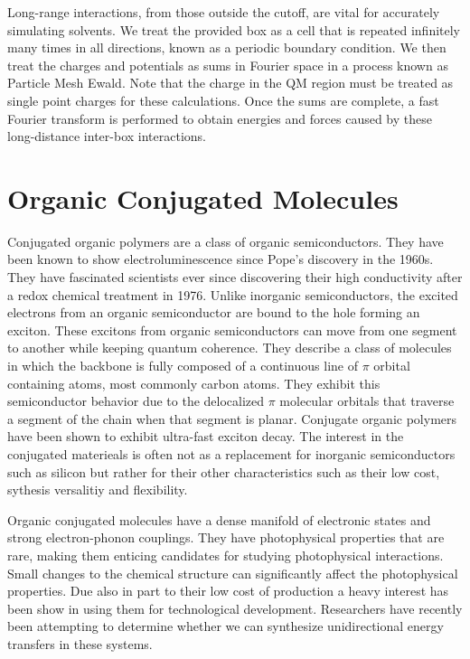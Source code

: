 Long-range interactions, from those outside the cutoff, are vital for accurately simulating solvents. 
We treat the provided box as a cell that is repeated infinitely many times in all directions, known as a periodic boundary condition. We then treat the charges and potentials as sums in Fourier space in a process known as Particle Mesh Ewald.\cite{Darden1993} Note that the charge in the QM region must be treated as single point charges for these calculations. Once the sums are complete, a fast Fourier transform is performed to obtain energies and forces caused by these long-distance inter-box interactions. \cite{Walker2008}

\section{Organic Conjugated Molecules}
Conjugated organic polymers are a class of organic semiconductors. They have been known to show electroluminescence since Pope's discovery in the 1960s.\cite{pope1963electroluminescence} They have fascinated scientists ever since discovering their high conductivity after a redox chemical treatment in 1976. \cite{chiang1977electrical} Unlike inorganic semiconductors, the excited electrons from an organic semiconductor are bound to the hole forming an exciton.\cite{scholes2011excitons} These excitons from organic semiconductors can move from one segment to another while keeping quantum coherence. \cite{collini2009coherent} They describe a class of molecules in which the backbone is fully composed of a continuous line of \(\pi\) orbital containing atoms, most commonly carbon atoms. They exhibit this semiconductor behavior due to the delocalized \(\pi\) molecular orbitals that traverse a segment of the chain when that segment is planar.\cite{bredas1999excited}
Conjugate organic polymers have been shown to exhibit ultra-fast exciton decay.\cite{nelson2018coherent,Fernandez-Alberti2009} The interest in the conjugated materieals is often not as a replacement for inorganic semiconductors such as silicon but rather for their other characteristics such as their low cost, sythesis versalitiy and flexibility. \cite{bredas1999excited}


Organic conjugated molecules have a dense manifold of electronic states and strong electron-phonon couplings.\cite{tretiak2002conformational,nelson2011nonadiabatic,nelson2014nonadiabatic}
They have photophysical properties that are rare, making them enticing candidates for studying photophysical interactions. \cite{bredas1999excited,spano2000emission}
Small changes to the chemical structure can significantly affect the photophysical properties.\cite{andre1991quantum}
Due also in part to their low cost of production a heavy interest has been show in using them for technological development.\cite{granstrom1998laminated,cao1999improved,sirringhaus2000high,bredas2004charge,bredas2009excitons,bredas2009molecular,collini2009coherent}
Researchers have recently been attempting to determine whether we can synthesize unidirectional energy transfers in these systems.\cite{soler2012analysis,soler2014signature,Galindo2015,FernandezAlberti2010,FernandezAlberti2012}

